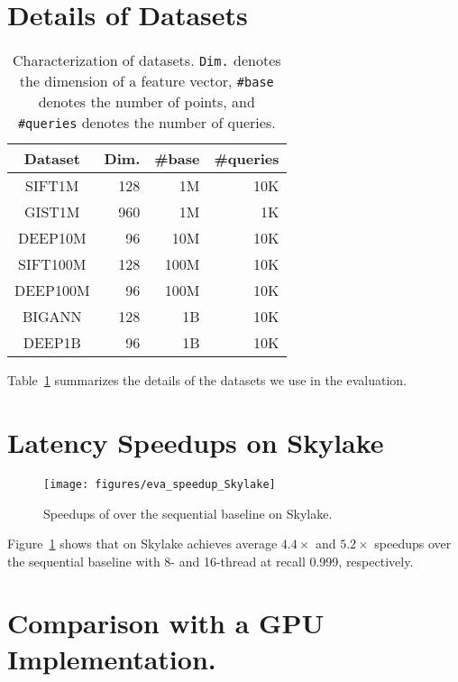 \section{Details of Datasets} 
\begin{table}[h]
\small
\caption{Characterization of  datasets. \textmd{ {\tt Dim.} denotes the dimension of a feature vector, {\tt \#base} denotes the number of points, and {\tt \#queries} denotes the number of queries.}}\label{tab:datasets}
\centering
\begin{tabular}{|c|r|r|r|}
    \hline
    Dataset  & Dim. & \#base & \#queries \\ 
    \hline
    \hline
    SIFT1M  &       128 &      1M &        10K \\
    GIST1M  &       960 &      1M &         1K \\
    DEEP10M  &        96 &     10M &        10K \\
    SIFT100M &       128 &    100M &        10K \\
    DEEP100M &        96 &    100M &        10K \\ 
    BIGANN &       128 &    1B &        10K \\
    DEEP1B &        96 &    1B &        10K \\ \hline
\end{tabular}
\end{table}

Table~\ref{tab:datasets} summarizes the details of the datasets we use in the evaluation. 



\section{Latency Speedups on Skylake}

\begin{figure}[h!]
    \centering
    \texttt{[image: figures/eva\_speedup\_Skylake]}
    \caption[Speedups of \Hammer]{Speedups of \Hammer over the sequential baseline on Skylake.}
    \label{fig:eval-speedup-skylake}
\end{figure}

Figure~\ref{fig:eval-speedup-skylake} shows that \Hammer on Skylake achieves average $4.4\times$ and $5.2\times$ speedups over the sequential baseline with 8- and 16-thread at recall 0.999, respectively. 

\section{Comparison with a GPU Implementation.} 

